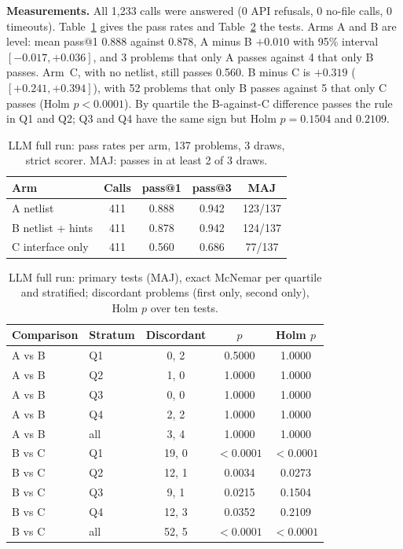 \documentclass[conference]{IEEEtran}
\newcommand{\hev}[1]{\par\smallskip\noindent\textbf{#1}}
\begin{document}
\hev{Measurements.} All 1,233 calls were answered (0 API refusals, 0 no-file calls, 0 timeouts). Table~\ref{tab:llm-full} gives the pass rates and Table~\ref{tab:llm-full-tests} the tests. Arms A and B are level: mean pass@1 0.888 against 0.878, A minus B $+0.010$ with 95\% interval $[-0.017,+0.036]$, and 3 problems that only A passes against 4 that only B passes. Arm~C, with no netlist, still passes 0.560. B minus C is $+0.319$ ($[+0.241,+0.394]$), with 52 problems that only B passes against 5 that only C passes (Holm $p<0.0001$). By quartile the B-against-C difference passes the rule in Q1 and Q2; Q3 and Q4 have the same sign but Holm $p=0.1504$ and $0.2109$.

\begin{table}[t]
\centering
\caption{LLM full run: pass rates per arm, 137 problems, 3 draws, strict scorer. MAJ: passes in at least 2 of 3 draws.}
\label{tab:llm-full}
\small
\begin{tabular}{@{}lcccc@{}}
\toprule
Arm & Calls & pass@1 & pass@3 & MAJ \\
\midrule
A netlist & 411 & 0.888 & 0.942 & 123/137 \\
B netlist + hints & 411 & 0.878 & 0.942 & 124/137 \\
C interface only & 411 & 0.560 & 0.686 & 77/137 \\
\bottomrule
\end{tabular}
\end{table}

\begin{table}[t]
\centering
\caption{LLM full run: primary tests (MAJ), exact McNemar per quartile and stratified; discordant problems (first only, second only), Holm $p$ over ten tests.}
\label{tab:llm-full-tests}
\small
\begin{tabular}{@{}llccc@{}}
\toprule
Comparison & Stratum & Discordant & $p$ & Holm $p$ \\
\midrule
A vs B & Q1 & 0, 2 & 0.5000 & 1.0000 \\
A vs B & Q2 & 1, 0 & 1.0000 & 1.0000 \\
A vs B & Q3 & 0, 0 & 1.0000 & 1.0000 \\
A vs B & Q4 & 2, 2 & 1.0000 & 1.0000 \\
A vs B & all & 3, 4 & 1.0000 & 1.0000 \\
B vs C & Q1 & 19, 0 & $<0.0001$ & $<0.0001$ \\
B vs C & Q2 & 12, 1 & 0.0034 & 0.0273 \\
B vs C & Q3 & 9, 1 & 0.0215 & 0.1504 \\
B vs C & Q4 & 12, 3 & 0.0352 & 0.2109 \\
B vs C & all & 52, 5 & $<0.0001$ & $<0.0001$ \\
\bottomrule
\end{tabular}
\end{table}
\end{document}
